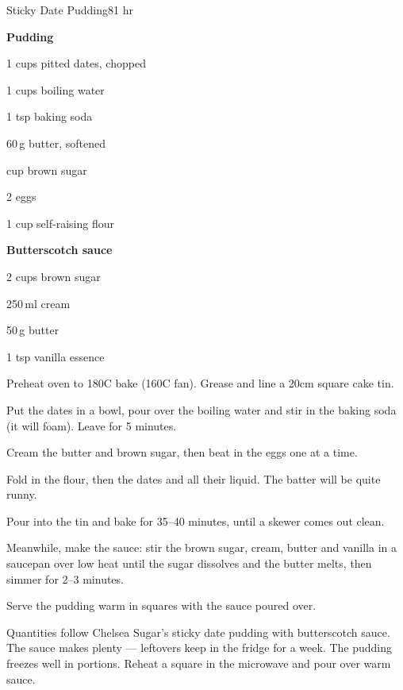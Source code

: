 \begin{recipebox}{Sticky Date Pudding}{8}{1 hr}
\begin{ingredients}
  \item[] \textbf{Pudding}
  \item 1 cups pitted dates, chopped
  \item 1 cups boiling water
  \item 1 tsp baking soda
  \item 60\,g butter, softened
  \item {} cup brown sugar
  \item 2 eggs
  \item 1 cup self-raising flour
  \item[] \textbf{Butterscotch sauce}
  \item 2 cups brown sugar
  \item 250\,ml cream
  \item 50\,g butter
  \item 1 tsp vanilla essence
\end{ingredients}

\begin{method}
  \item Preheat oven to 180\degree C bake (160\degree C fan). Grease and line a 20cm square cake tin.
  \item Put the dates in a bowl, pour over the boiling water and stir in the baking soda (it will foam). Leave for 5 minutes.
  \item Cream the butter and brown sugar, then beat in the eggs one at a time.
  \item Fold in the flour, then the dates and all their liquid. The batter will be quite runny.
  \item Pour into the tin and bake for 35--40 minutes, until a skewer comes out clean.
  \item Meanwhile, make the sauce: stir the brown sugar, cream, butter and vanilla in a saucepan over low heat until the sugar dissolves and the butter melts, then simmer for 2--3 minutes.
  \item Serve the pudding warm in squares with the sauce poured over.
\end{method}

\begin{notes}
Quantities follow Chelsea Sugar's sticky date pudding with butterscotch sauce. The sauce makes plenty --- leftovers keep in the fridge for a week.
The pudding freezes well in portions. Reheat a square in the microwave and pour over warm sauce.
\end{notes}
\end{recipebox}
